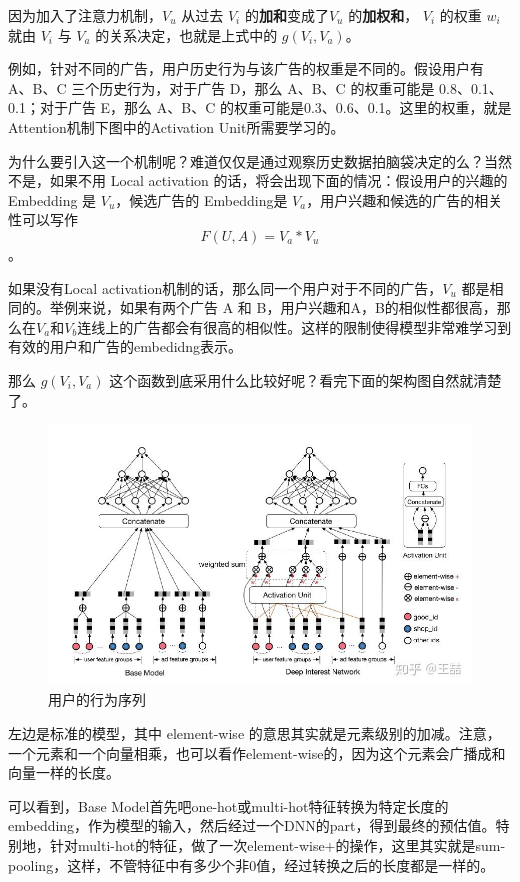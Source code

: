\documentclass[12pt]{article}
\begin{document}
因为加入了注意力机制，$V_u$ 从过去 $V_i$ 的\textbf{加和}变成了$V_u$ 的\textbf{加权和}， $V_i$ 的权重 $w_i$ 就由 $V_i$ 与 $V_a$ 的关系决定，也就是上式中的 $g(V_i, V_a)$。

\begin{framed}
例如，针对不同的广告，用户历史行为与该广告的权重是不同的。假设用户有 A、B、C 三个历史行为，对于广告 D，那么 A、B、C 的权重可能是 0.8、0.1、0.1；对于广告 E，那么 A、B、C 的权重可能是0.3、0.6、0.1。这里的权重，就是Attention机制下图中的Activation Unit所需要学习的。

为什么要引入这一个机制呢？难道仅仅是通过观察历史数据拍脑袋决定的么？当然不是，如果不用 Local activation 的话，将会出现下面的情况：假设用户的兴趣的 Embedding 是 $V_u$，候选广告的 Embedding是 $V_a$，用户兴趣和候选的广告的相关性可以写作
$$
F(U,A) = V_a * V_u
$$。

如果没有Local activation机制的话，那么同一个用户对于不同的广告，$V_u$ 都是相同的。举例来说，如果有两个广告 A 和 B，用户兴趣和A，B的相似性都很高，那么在$V_a$和$V_b$连线上的广告都会有很高的相似性。这样的限制使得模型非常难学习到有效的用户和广告的embedidng表示。
\end{framed}

那么 $g(V_i, V_a)$ 这个函数到底采用什么比较好呢？看完下面的架构图自然就清楚了。
\begin{figure}[H]
    \centering
    \includegraphics[width=1\textwidth]{fig/Ali_DIN_Structure.jpg}
    \caption{用户的行为序列}
\end{figure}

左边是标准的模型，其中 element-wise 的意思其实就是元素级别的加减。注意，一个元素和一个向量相乘，也可以看作element-wise的，因为这个元素会广播成和向量一样的长度。

可以看到，Base Model首先吧one-hot或multi-hot特征转换为特定长度的embedding，作为模型的输入，然后经过一个DNN的part，得到最终的预估值。特别地，针对multi-hot的特征，做了一次element-wise+的操作，这里其实就是sum-pooling，这样，不管特征中有多少个非0值，经过转换之后的长度都是一样的。
\end{document}
